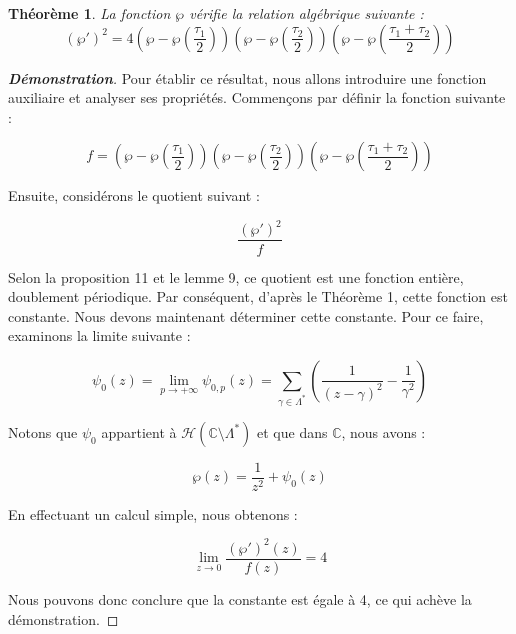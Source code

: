 \documentclass[12pt]{article}
\newtheorem{theorem}{Théorème}
\begin{document}
                    \begin{theorem}
                        La fonction $\wp$ vérifie la relation algébrique suivante :
                        \[
                        (\wp')^2 = 4 \left( \wp - \wp\left( \frac{\tau_1}{2} \right) \right) \left( \wp - \wp\left( \frac{\tau_2}{2} \right) \right) \left( \wp - \wp\left( \frac{\tau_1 + \tau_2}{2} \right) \right)
                        \]
                        \end{theorem}

                        \begin{proof}[\textbf{Démonstration}]

                        Pour établir ce résultat, nous allons introduire une fonction auxiliaire et analyser ses propriétés. Commençons par définir la fonction suivante :

                        \[
                        f = \left( \wp - \wp\left( \frac{\tau_1}{2} \right) \right) \left( \wp - \wp\left( \frac{\tau_2}{2} \right) \right) \left( \wp - \wp\left( \frac{\tau_1 + \tau_2}{2} \right) \right)
                        \]

                        Ensuite, considérons le quotient suivant :

                        \[
                        \frac{(\wp')^2}{f}
                        \]

                        Selon la proposition 11 et le lemme 9, ce quotient est une fonction entière, doublement périodique. Par conséquent, d'après le Théorème 1, cette fonction est constante. Nous devons maintenant déterminer cette constante. Pour ce faire, examinons la limite suivante :

                        \[
                        \psi_0(z) = \lim_{p \to +\infty} \psi_{0,p}(z) = \sum_{\gamma\in \Lambda ^* } \left( \frac{1}{(z - \gamma)^2} - \frac{1}{\gamma^2} \right)
                        \]

                        Notons que $\psi_0$ appartient à $\mathcal{H}(\mathbb{C} \setminus \Lambda^*)$ et que dans $\mathbb{C}$, nous avons :

                        \[
                        \wp(z) = \frac{1}{z^2} + \psi_0(z)
                        \]

                        En effectuant un calcul simple, nous obtenons :

                        \[
                        \lim_{z \to 0} \frac{(\wp')^2(z)}{f(z)} = 4
                        \]

                        Nous pouvons donc conclure que la constante est égale à 4, ce qui achève la démonstration.
                        \end{proof}
\end{document}
